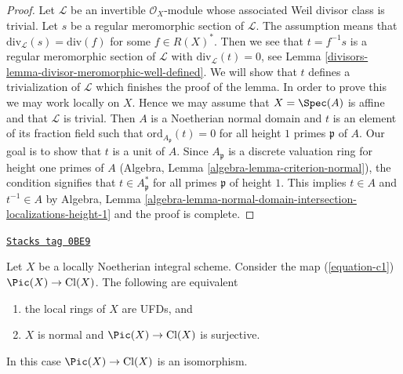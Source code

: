 \begin{proof}

Let $\mathcal{L}$ be an invertible $\mathcal{O}_X$-module whose
associated Weil divisor class is trivial. Let $s$ be a regular
meromorphic section of $\mathcal{L}$. The assumption means that
$\text{div}_\mathcal{L}(s) = \text{div}(f)$ for some
$f \in R(X)^*$. Then we see that $t = f^{-1}s$ is a regular
meromorphic section of $\mathcal{L}$ with
$\text{div}_\mathcal{L}(t) = 0$, see
Lemma \ref{divisors-lemma-divisor-meromorphic-well-defined}.
We will show that $t$ defines a trivialization of $\mathcal{L}$
which finishes the proof of the lemma.
In order to prove this we may work locally on $X$.
Hence we may assume that $X = \Spec(A)$ is affine
and that $\mathcal{L}$ is trivial. Then $A$ is a Noetherian normal
domain and $t$ is an element of its fraction field
such that $\text{ord}_{A_\mathfrak p}(t) = 0$
for all height $1$ primes $\mathfrak p$ of $A$.
Our goal is to show that $t$ is a unit of $A$.
Since $A_\mathfrak p$ is a discrete valuation ring for height
one primes of $A$ (Algebra, Lemma \ref{algebra-lemma-criterion-normal}), the
condition signifies that $t \in A_\mathfrak p^*$ for all primes $\mathfrak p$
of height $1$. This implies $t \in A$ and $t^{-1} \in A$ by
Algebra, Lemma
\ref{algebra-lemma-normal-domain-intersection-localizations-height-1}
and the proof is complete.
\end{proof}

\begin{lemma}
\label{divisors-lemma-local-rings-UFD-c1-bijective}
\href{https://stacks.math.columbia.edu/tag/0BE9}{\texttt{Stacks tag 0BE9}}

Let $X$ be a locally Noetherian integral scheme. Consider the map
(\ref{equation-c1}) $\Pic(X) \to \text{Cl}(X)$.
The following are equivalent
\begin{enumerate}
\item the local rings of $X$ are UFDs, and
\item $X$ is normal and $\Pic(X) \to \text{Cl}(X)$
is surjective.
\end{enumerate}
In this case $\Pic(X) \to \text{Cl}(X)$ is an isomorphism.
\end{lemma}

